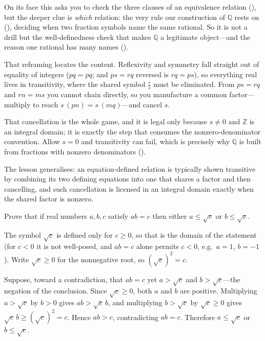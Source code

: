 \documentclass[main.tex]{subfiles}
\begin{document}
\begin{Reflection}
On its face this asks you to check the three clauses of an equivalence relation (), but
the deeper clue is \emph{which} relation: the very rule our construction of $\mathbb Q$ rests on
(), deciding when two fraction symbols name the same rational. So it is not a drill but
the well-definedness check that makes $\mathbb Q$ a legitimate object---and the reason one rational has
many names ().

That reframing locates the content. Reflexivity and symmetry fall straight out of equality of integers
($pq=pq$; and $ps=rq$ reversed is $rq=ps$), so everything real lives in transitivity, where the shared
symbol $\frac rs$ must be eliminated. From $ps=rq$ and $rn=ms$ you cannot chain directly, so you
manufacture a common factor---multiply to reach $s\,(pn)=s\,(mq)$---and cancel $s$.

That cancellation is the whole game, and it is legal only because $s\neq 0$ and $\mathbb Z$ is an
integral domain; it is exactly the step that consumes the nonzero-denominator convention. Allow $s=0$
and transitivity can fail, which is precisely why $\mathbb Q$ is built from fractions with nonzero
denominators ().

The lesson generalises: an equation-defined relation is typically shown transitive by combining its two
defining equations into one that shares a factor and then cancelling, and such cancellation is licensed
in an integral domain exactly when the shared factor is nonzero.
\end{Reflection}

Prove that if real numbers $a,b,c$ satisfy $ab=c$ then either $a\le\sqrt c$ or $b\le\sqrt c$.

\begin{Solution}
The symbol $\sqrt c$ is defined only for $c\ge 0$, so that is the domain of the statement (for $c<0$ it
is not well-posed, and $ab=c$ alone permits $c<0$, e.g.\ $a=1$, $b=-1$). Write $\sqrt c\ge 0$ for the
nonnegative root, so $(\sqrt c)^2=c$.

Suppose, toward a contradiction, that $ab=c$ yet $a>\sqrt c$ and $b>\sqrt c$---the negation of the
conclusion. Since $\sqrt c\ge 0$, both $a$ and $b$ are positive. Multiplying $a>\sqrt c$ by $b>0$
gives $ab>\sqrt c\,b$, and multiplying $b>\sqrt c$ by $\sqrt c\ge 0$ gives $\sqrt c\,b\ge(\sqrt
c)^2=c$. Hence $ab>c$, contradicting $ab=c$. Therefore $a\le\sqrt c$ or $b\le\sqrt c$.
\end{Solution}
\end{document}
